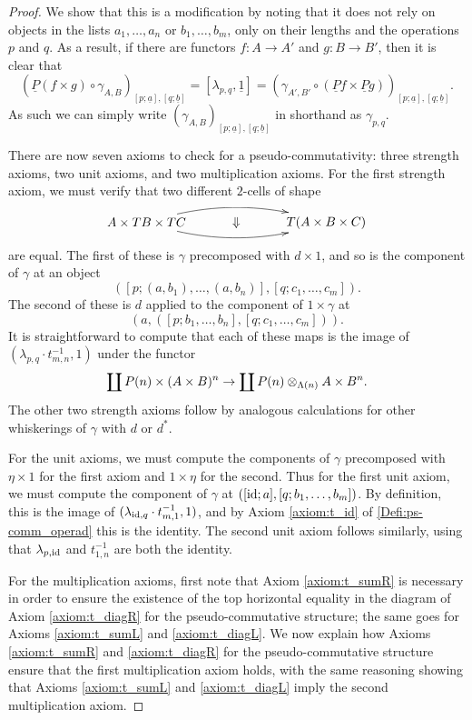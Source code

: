 \begin{proof}
We show that this is a modification by noting that it does not rely on objects in the lists $a_1, \ldots, a_n$ or $b_1, \ldots, b_m$, only on their lengths and the operations $p$ and $q$. As a result, if there are functors $f \colon A \rightarrow A'$ and $g \colon B \rightarrow B'$, then it is clear that
    \[
        (\underline{P}(f\times g) \circ \gamma_{A,B})_{\left[p;\underline{a}\right],\left[q;\underline{b}\right]} = [\lambda_{p,q},\underline{1}] = (\gamma_{A',B'} \circ (\underline{P}f\times \underline{P}g))_{\left[p;\underline{a}\right],\left[q;\underline{b}\right]}.
    \]
As such we can simply write $(\gamma_{A,B})_{[p;\underline{a}],[q;\underline{b}]}$ in shorthand as $\gamma_{p,q}$.

There are now seven axioms to check for a pseudo-commutativity: three strength axioms, two unit axioms, and two multiplication axioms. For the first strength axiom, we must verify that two different $2$-cells of shape
  \[
    \xy
      (0,0)*+{A \times TB \times TC}="0";
      (50,0)*+{T(A \times B \times C)}="1";
      {\ar@/^1pc/ "0"; "1"};
      {\ar@/_1pc/ "0"; "1"};
      (25,0)*{\Downarrow}
    \endxy
  \]
are equal. The first of these is $\gamma$ precomposed with $d \times 1$, and so is the component of $\gamma$ at an object
  \[
    \left( [p;(a,b_1),\ldots,(a,b_n)], [q; c_{1}, \ldots, c_{m}] \right).
  \]
The second of these is $d$ applied to the component of $1 \times \gamma$ at
  \[
    \left(a, ([p;b_1,\ldots,b_n], [q; c_{1}, \ldots, c_{m}]) \right).
  \]
It is straightforward to compute that each of these maps is the image of $\left(\lambda_{p,q}\cdot t_{m,n}^{-1},1\right)$ under the functor
  \[
    \coprod P(n) \times (A \times B)^{n} \rightarrow \coprod P(n) \otimes_{\Lambda(n)} A \times B^{n}.
  \]
The other two strength axioms follow by analogous calculations for other whiskerings of $\gamma$ with $d$ or $d^{*}$.

For the unit axioms, we must compute the components of $\gamma$ precomposed with $\eta \times 1$ for the first axiom and $1 \times \eta$ for the second. Thus for the first unit axiom, we must compute the component of $\gamma$ at $\left( [\textrm{id};a], [q; b_{1}, \ldots, b_{m}] \right)$. By definition, this is the image of $(\lambda_{\textrm{id},q}\cdot t^{-1}_{m,1}, 1)$, and by Axiom \eqref{axiom:t_id} of \cref{Defi:ps-comm_operad} this is the identity. The second unit axiom follows similarly, using that $\lambda_{p, \textrm{id}}$ and $t^{-1}_{1,n}$ are both the identity.

For the multiplication axioms, first note that Axiom \eqref{axiom:t_sumR} is necessary in order to ensure the existence of the top horizontal equality in the diagram of Axiom \eqref{axiom:t_diagR} for the pseudo-commutative structure; the same goes for Axioms \eqref{axiom:t_sumL} and \eqref{axiom:t_diagL}. We now explain how Axioms \eqref{axiom:t_sumR} and \eqref{axiom:t_diagR} for the pseudo-commutative structure ensure that the first multiplication axiom holds, with the same reasoning showing that Axioms \eqref{axiom:t_sumL} and \eqref{axiom:t_diagL} imply the second multiplication axiom.


\end{proof}
